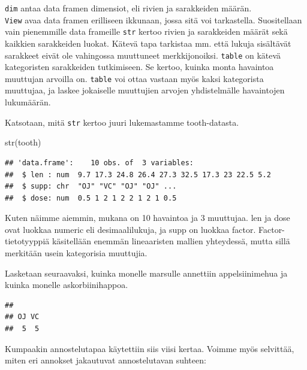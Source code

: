 \documentclass[
]{book}
\newenvironment{Shaded}{\begin{snugshade}}{\end{snugshade}}
\newcommand{\FunctionTok}[1]{\textcolor[rgb]{0.00,0.00,0.00}{#1}}
\newcommand{\NormalTok}[1]{#1}
\newcommand{\SpecialCharTok}[1]{\textcolor[rgb]{0.00,0.00,0.00}{#1}}
\begin{document}
\texttt{dim} antaa data framen dimensiot, eli rivien ja sarakkeiden määrän.\\
\texttt{View} avaa data framen erilliseen ikkunaan, jossa sitä voi tarkastella. Suositellaan vain pienemmille data frameille
\texttt{str} kertoo rivien ja sarakkeiden määrät sekä kaikkien sarakkeiden luokat. Kätevä tapa tarkistaa mm. että lukuja sisältävät sarakkeet eivät ole vahingossa muuttuneet merkkijonoiksi.
\texttt{table} on kätevä kategoristen sarakkeiden tutkimiseen. Se kertoo, kuinka monta havaintoa muuttujan arvoilla on. \texttt{table} voi ottaa vastaan myös kaksi kategorista muuttujaa, ja laskee jokaiselle muuttujien arvojen yhdistelmälle havaintojen lukumäärän.

Katsotaan, mitä \texttt{str} kertoo juuri lukemastamme tooth-datasta.

\begin{Shaded}
\begin{Highlighting}[]
\FunctionTok{str}\NormalTok{(tooth)}
\end{Highlighting}
\end{Shaded}

\begin{verbatim}
## 'data.frame':    10 obs. of  3 variables:
##  $ len : num  9.7 17.3 24.8 26.4 27.3 32.5 17.3 23 22.5 5.2
##  $ supp: chr  "OJ" "VC" "OJ" "OJ" ...
##  $ dose: num  0.5 1 2 1 2 2 1 2 1 0.5
\end{verbatim}

Kuten näimme aiemmin, mukana on 10 havaintoa ja 3 muuttujaa. len ja dose ovat luokkaa numeric eli desimaalilukuja, ja supp on luokkaa factor. Factor-tietotyyppiä käsitellään enemmän lineaaristen mallien yhteydessä, mutta sillä merkitään usein kategorisia muuttujia.

Lasketaan seuraavaksi, kuinka monelle marsulle annettiin appelsiinimehua ja kuinka monelle askorbiinihappoa.

\begin{Shaded}
\end{Shaded}

\begin{verbatim}
## 
## OJ VC 
##  5  5
\end{verbatim}

Kumpaakin annostelutapaa käytettiin siis viisi kertaa. Voimme myös selvittää, miten eri annokset jakautuvat annostelutavan suhteen:
\end{document}
